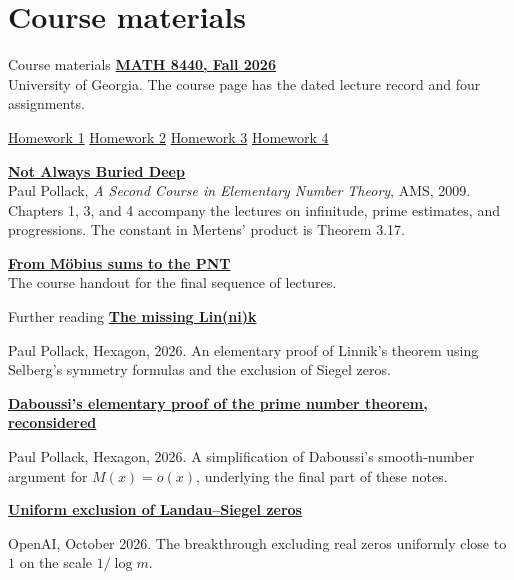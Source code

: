 \documentclass[aspectratio=169,11pt]{beamer}
\newcommand{\link}[2]{{\color{teal}\href{#1}{#2}}}
\newcommand{\oaurl}{https://github.com/openai/math/blob/main/preprints/Uniform-exclusion-of-Landau-Siegel-zeros-October-1-2026/paper.pdf}
\begin{document}
\section{Course materials}
\begin{frame}{Course materials}
\small
\link{https://www.pollack-math.net/8440f26.html}{\textbf{MATH 8440, Fall 2026}}\\
University of Georgia. The course page has the dated lecture record and four assignments.

\link{https://www.pollack-math.net/8440f26/HW1.pdf}{Homework 1}\quad
\link{https://www.pollack-math.net/8440f26/HW2.pdf}{Homework 2}\quad
\link{https://www.pollack-math.net/8440f26/HW3.pdf}{Homework 3}\quad
\link{https://www.pollack-math.net/8440f26/HW4.pdf}{Homework 4}

\link{https://www.pollack-math.net/NABDofficial.pdf}{\textbf{Not Always Buried Deep}}\\
Paul Pollack, \emph{A Second Course in Elementary Number Theory}, AMS, 2009. Chapters 1, 3, and 4 accompany the lectures on infinitude, prime estimates, and progressions. The constant in Mertens' product is Theorem 3.17.

\link{https://www.pollack-math.net/8440f26/pnt-part-i.pdf}{\textbf{From M\"obius sums to the PNT}}\\
The course handout for the final sequence of lectures.
\end{frame}

\begin{frame}{Further reading}
\link{https://hexagonmath.org/2610.00545v1}{\textbf{The missing Lin(ni)k}}

Paul Pollack, Hexagon, 2026. An elementary proof of Linnik's theorem using Selberg's symmetry formulas and the exclusion of Siegel zeros.

\link{https://hexagonmath.org/2611.00636v1}{\textbf{Daboussi's elementary proof of the prime number theorem, reconsidered}}

Paul Pollack, Hexagon, 2026. A simplification of Daboussi's smooth-number argument for $M(x)=o(x)$, underlying the final part of these notes.

\link{\oaurl}{\textbf{Uniform exclusion of Landau--Siegel zeros}}

OpenAI, October 2026. The breakthrough excluding real zeros uniformly close to $1$ on the scale $1/\log m$.
\end{frame}
\end{document}
